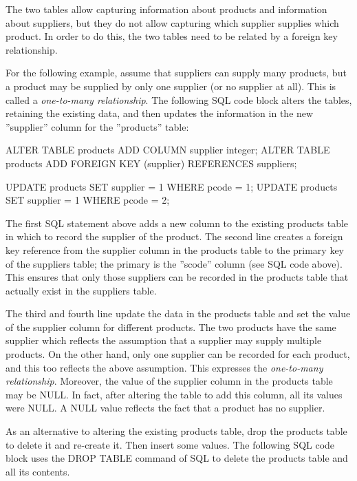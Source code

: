 The two tables allow capturing information about products and information about suppliers, but they do not allow capturing which supplier supplies which product. In order to do this, the two tables need to be related by a foreign key relationship. 

For the following example, assume that suppliers can supply many products, but a product may be supplied by only one supplier (or no supplier at all). This is called a \emph{one-to-many relationship}. The following SQL code block alters the tables, retaining the existing data, and then updates the information in the new ''supplier'' column for the ''products'' table:

\begin{samepage}
\begin{sqlcode}
ALTER TABLE products ADD COLUMN supplier integer;
ALTER TABLE products ADD FOREIGN KEY (supplier) REFERENCES suppliers;

UPDATE products SET supplier = 1 WHERE pcode = 1;
UPDATE products SET supplier = 1 WHERE pcode = 2;
\end{sqlcode}
\end{samepage}

The first SQL statement above adds a new column to the existing products table in which to record the supplier of the product. The second line creates a foreign key reference from the supplier column in the products table to the primary key of the suppliers table; the primary is the ''scode'' column (see SQL code above). This ensures that only those suppliers can be recorded in the products table that actually exist in the suppliers table. 

The third and fourth line update the data in the products table and set the value of the supplier column for different products. The two products have the same supplier which reflects the assumption that a supplier may supply multiple products. On the other hand, only one supplier can be recorded for each product, and this too reflects the above assumption. This expresses the \emph{one-to-many relationship}. Moreover, the value of the supplier column in the products table may be NULL. In fact, after altering the table to add this column, all its values were NULL. A NULL value reflects the fact that a product has no supplier.

As an alternative to altering the existing products table, drop the products table to delete it and re-create it. Then insert some values. The following SQL code block uses the DROP TABLE command of SQL to delete the products table and all its contents.

